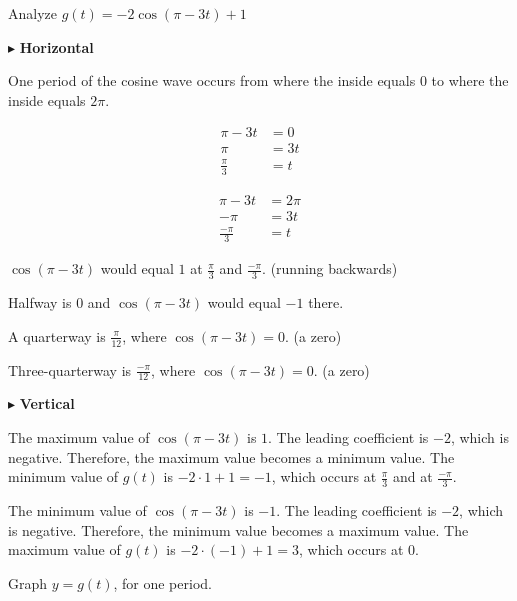 \documentclass{ximera}
\begin{document}
\begin{example}



Analyze  $g(t) = -2 \cos(\pi - 3t) + 1$


\begin{explanation}

$\blacktriangleright$ \textbf{Horizontal}


One period of the cosine wave occurs from where the inside equals $0$ to where the inside equals $2 \pi$.


\begin{align*}
\pi - 3t  & =  0 \\
\pi       & =  3t \\
\frac{\pi}{3}       & =  t
\end{align*}



\begin{align*}
\pi - 3t  & =  2 \pi \\
-\pi      & =  3t \\
\frac{-\pi}{3}       & =  t
\end{align*}


$\cos(\pi - 3t)$ would equal $1$ at $\frac{\pi}{3}$ and $\frac{-\pi}{3}$. (running backwards)

Halfway is $0$ and $\cos(\pi - 3t)$ would equal $-1$ there.

A quarterway is $\frac{\pi}{12}$, where $\cos(\pi - 3t) = 0$.  (a zero)

Three-quarterway is $\frac{-\pi}{12}$, where $\cos(\pi - 3t) = 0$. (a zero)






$\blacktriangleright$ \textbf{Vertical}


The maximum value of $\cos(\pi - 3t)$ is $1$.  The leading coefficient is $-2$, which is negative.  Therefore, the maximum value becomes a minimum value. The minimum value of $g(t)$ is $-2 \cdot 1 + 1 = -1$, which occurs at $\frac{\pi}{3}$ and at $\frac{-\pi}{3}$. 




The minimum value of $\cos(\pi - 3t)$ is $-1$.  The leading coefficient is $-2$, which is negative.   Therefore, the minimum value becomes a maximum value.  The maximum value of $g(t)$ is $-2 \cdot (-1) + 1 = 3$, which occurs at $0$. 








Graph $y = g(t)$, for one period.


\end{explanation}
\end{example}
\end{document}
